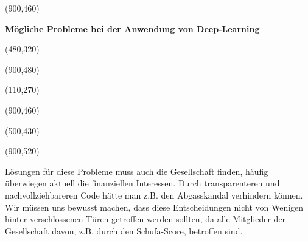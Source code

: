 \documentclass[36pt,extrafontsizes,article,oneside,final]{memoir}
\begin{document}
\begin{minipage}[c][\textheight-50pt][t]{0.50\textwidth}
\begin{center}
\makebox(900,460){
\parbox{900pt}{
\begin{center}
\begin{Spacing}{2}
\textbf{
\huge
Mögliche Probleme bei der Anwendung von Deep-Learning
}
\end{Spacing}
\end{center}
}}

\makebox(480,320){
}

\colorbox{gray!20}{
\makebox(900,480){
\large
{}}}

\makebox(110,270){
}

\colorbox{gray!20}{
\makebox(900,460){
\large
{}}}

\makebox(500,430){
}

\colorbox{gray!20}{
\makebox(900,520){
\parbox{850pt}{


Lösungen für diese Probleme muss auch die Gesellschaft finden,
häufig überwiegen aktuell die finanziellen Interessen.
Durch transparenteren und nachvollziehbareren Code hätte
man z.B. den Abgasskandal verhindern können. 
Wir müssen uns bewusst machen, dass diese Entscheidungen nicht von Wenigen hinter verschlossenen Türen getroffen werden sollten,
da alle Mitglieder der Gesellschaft davon,
z.B. durch den Schufa-Score, betroffen sind.

}}}

\end{center}
\end{minipage}
\end{document}
